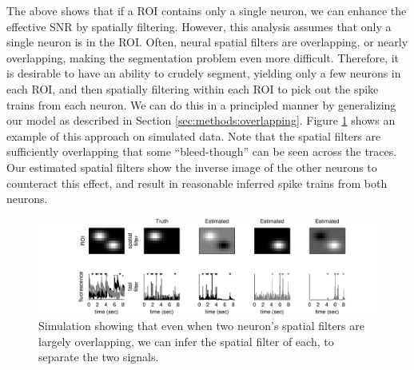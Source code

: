 The above shows that if a ROI contains only a single neuron, we can enhance the effective SNR by spatially filtering.  However, this analysis assumes that only a single neuron is in the ROI.  Often, neural spatial filters are overlapping, or nearly overlapping, making the segmentation problem even more difficult.  Therefore, it is desirable to have an ability to crudely segment, yielding only a few neurons in each ROI, and then spatially filtering within each ROI to pick out the spike trains from each neuron.  We can do this in a principled manner by generalizing our model as described in Section \ref{sec:methods:overlapping}.  Figure \ref{fig:spatial_multi} shows an example of this approach on simulated data. Note that the spatial filters are sufficiently overlapping that some ``bleed-though'' can be seen across the traces.  Our estimated spatial filters show the inverse image of the other neurons to counteract this effect, and result in reasonable inferred spike trains from both neurons.


\begin{figure}[h!]
\centering \includegraphics[width=.9\linewidth]{../figs/spatial_multi2}
\caption{Simulation showing that even when two neuron's spatial filters are largely overlapping, we can infer the spatial filter of each, to separate the two signals.  } \label{fig:spatial_multi}
\end{figure}

